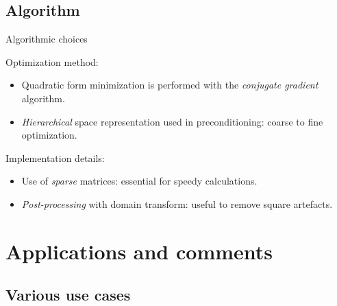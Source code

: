 \documentclass{beamer}
\begin{document}
\subsection{Algorithm}

\begin{frame}{Algorithmic choices}

Optimization method:
\begin{itemize}
    \item Quadratic form minimization is performed with the \textit{conjugate gradient} algorithm.
    \item \textit{Hierarchical} space representation used in preconditioning: coarse to fine optimization.
\end{itemize}

\pause
Implementation details:
\begin{itemize}
    \item Use of \textit{sparse} matrices: essential for speedy calculations.
    \item \textit{Post-processing} with domain transform: useful to remove square artefacts.
\end{itemize}
    
\end{frame}

\section{Applications and comments}

\subsection{Various use cases}
\end{document}
